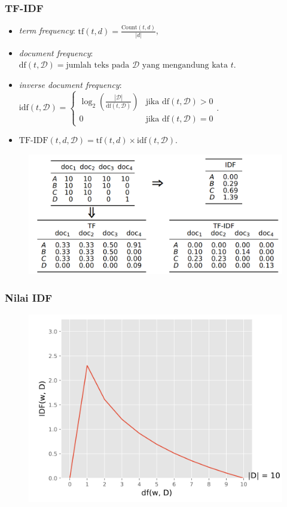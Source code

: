 \documentclass{beamer}
\newcommand{\f}[1]{\textit{#1}}
\begin{document}
\begin{frame}
    \frametitle{TF-IDF}
    \begin{itemize}
        \item \f{term frequency}: $\text{tf}(t, d) = \frac{\text{Count}(t, d)}{|d|}$,
        \item \f {document frequency}: $\text{df}(t, \mathcal{D}) = \text{jumlah teks pada } \mathcal{D} \text{ yang mengandung kata } t$. 
        \item \f{inverse document frequency}: $\text{idf}(t, \mathcal{D}) = \begin{cases}
            \log_2\left(\frac{|\mathcal{D}|}{\text{df}(t, \mathcal{D})}\right) & \text{jika } \text{df}(t, \mathcal{D}) > 0 \\
            0 & \text{jika } \text{df}(t, \mathcal{D}) = 0
        \end{cases}$.
        \item $\text{TF-IDF}(t, d, \mathcal{D}) = \text{tf}(t, d) \times \text{idf}(t, \mathcal{D})$.
    \end{itemize}

    \begin{figure}[!ht]
        \centering
        \includegraphics[width=1\textwidth]{assets/pics/tf-idf-matriks.png}
    \end{figure}
\end{frame}

\begin{frame}
    \frametitle{Nilai IDF}
    \begin{figure}[!ht]
        \centering
        \includegraphics[width=1\textwidth]{assets/pics/idf-graph.png}
        \end{figure}
\end{frame}
\end{document}
